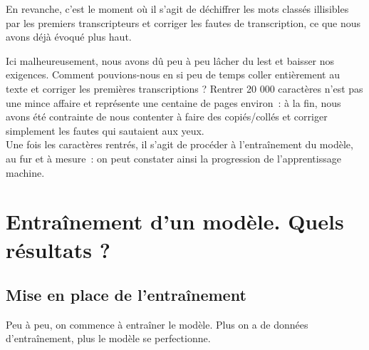En revanche, c'est le moment où il s'agit de déchiffrer les mots classés illisibles par les premiers transcripteurs et corriger les fautes de transcription, ce que nous avons déjà évoqué plus haut.

Ici malheureusement, nous avons dû peu à peu lâcher du lest et baisser nos exigences. Comment pouvions-nous en si peu de temps coller entièrement au texte et corriger les premières transcriptions ? Rentrer 20 000 caractères n'est pas une mince affaire et représente une centaine de pages environ~: à la fin, nous avons été contrainte de nous contenter à faire des copiés/collés et corriger simplement les fautes qui sautaient aux yeux.\\

Une fois les caractères rentrés, il s'agit de procéder à l'entraînement du modèle, au fur et à mesure~: on peut constater ainsi la progression de l'apprentissage machine.

\section{Entraînement d'un modèle. Quels résultats ?}

\subsection{Mise en place de l'entraînement}

Peu à peu, on commence à entraîner le modèle. Plus on a de données d'entraînement, plus le modèle se perfectionne. 

